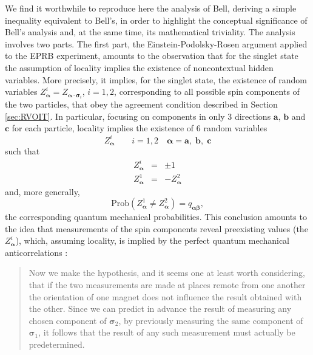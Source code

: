 \documentclass[12pt]{article}
\begin{document}
We find it worthwhile to reproduce here the analysis of Bell, deriving
a simple inequality equivalent to Bell's, in order to highlight the
conceptual significance of Bell's analysis and, at the same time, its
mathematical triviality.  The analysis involves two parts. The first
part, the Einstein-Podolsky-Rosen argument applied to the EPRB
experiment, amounts to the observation that for the singlet state the
assumption of locality implies the existence of noncontextual hidden
variables.  More precisely, it implies, for the singlet state, the
existence of random variables $ Z^{i}_{\boldsymbol{\alpha}}=
Z_{\boldsymbol{\alpha}\cdot \boldsymbol{\sigma}_i}$, $i=1, 2$,
corresponding to all possible spin components of the two particles,
that obey the agreement condition described in Section
\ref{sec:RVOIT}.  In particular, focusing on components in only 3
directions $\mathbf{a}$, $\mathbf{b}$ and $\mathbf{c}$ for each
particle, locality implies the existence of 6 random variables
$$
Z^{i}_{\boldsymbol{\alpha}}\qquad i=1,2\quad {\boldsymbol{\alpha}}=
\mathbf{a},\; \mathbf{b},\; \mathbf{c}
$$
such that
\begin{eqnarray}
Z^{i}_{\boldsymbol{\alpha}} &=& \pm 1  \label{eq:pc1}\\
Z^{1}_{{\boldsymbol{\alpha}}}& =&
-Z^{2}_{{\boldsymbol{\alpha}}}\label{eq:pc2}
\end{eqnarray}
and, more generally,
\begin{equation}
\text{Prob}(Z^{1}_{\boldsymbol{\alpha}}\neq
Z^{2}_{\boldsymbol{\alpha}}) =
q_{ {\boldsymbol{\alpha}}
   {\boldsymbol{\beta}}   }, \label{eq:pc3}
\end{equation}
the corresponding quantum mechanical probabilities. This conclusion
amounts to the idea that measurements of the spin components reveal
preexisting values (the $Z^{i}_{\boldsymbol{\alpha}}$), which,
assuming locality, is implied by the perfect quantum mechanical
anticorrelations \cite{Bel64}:
\begin{quotation}\small\noindent
   Now we make the hypothesis, and it seems one at least worth
   considering, that if the two measurements are made at places remote
   {}from one another the orientation of one magnet does not influence
   the result obtained with the other. Since we can predict in advance
   the result of measuring any chosen component of
   ${\boldsymbol{\sigma}}_2$, by previously measuring the same
   component of ${\boldsymbol{\sigma}}_1$, it follows that the result
   of any such measurement must actually be predetermined.
\end{quotation}
\end{document}
